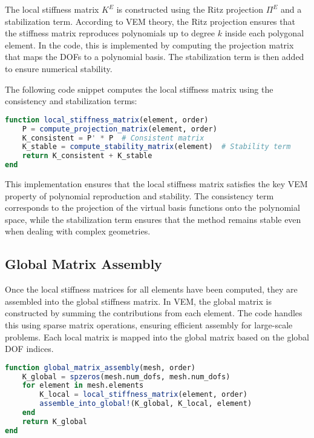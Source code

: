 \documentclass[class=article, crop=false]{standalone}
\begin{document}
The local stiffness matrix $K^E$ is constructed using the Ritz projection $\Pi^E$ and a stabilization term. According to VEM theory, the Ritz projection ensures that the stiffness matrix reproduces polynomials up to degree $k$ inside each polygonal element. In the code, this is implemented by computing the projection matrix that maps the DOFs to a polynomial basis. The stabilization term is then added to ensure numerical stability.

The following code snippet computes the local stiffness matrix using the consistency and stabilization terms:

\begin{lstlisting}[language=Julia, caption={Computation of Local Stiffness Matrix}]
function local_stiffness_matrix(element, order)
    P = compute_projection_matrix(element, order)
    K_consistent = P' * P  # Consistent matrix
    K_stable = compute_stability_matrix(element)  # Stability term
    return K_consistent + K_stable
end
\end{lstlisting}

This implementation ensures that the local stiffness matrix satisfies the key VEM property of polynomial reproduction and stability. The consistency term corresponds to the projection of the virtual basis functions onto the polynomial space, while the stabilization term ensures that the method remains stable even when dealing with complex geometries.

\subsection{Global Matrix Assembly}

Once the local stiffness matrices for all elements have been computed, they are assembled into the global stiffness matrix. In VEM, the global matrix is constructed by summing the contributions from each element. The code handles this using sparse matrix operations, ensuring efficient assembly for large-scale problems. Each local matrix is mapped into the global matrix based on the global DOF indices.

\begin{lstlisting}[language=Julia, caption={Global Matrix Assembly}]
function global_matrix_assembly(mesh, order)
    K_global = spzeros(mesh.num_dofs, mesh.num_dofs)
    for element in mesh.elements
        K_local = local_stiffness_matrix(element, order)
        assemble_into_global!(K_global, K_local, element)
    end
    return K_global
end
\end{lstlisting}
\end{document}
